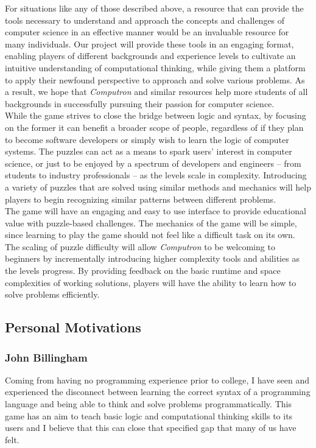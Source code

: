 For situations like any of those described above, a resource that can provide the tools necessary to understand and approach the concepts and challenges of computer science in an effective manner would be an invaluable resource for many individuals. Our project will provide these tools in an engaging format, enabling players of different backgrounds and experience levels to cultivate an intuitive understanding of computational thinking, while giving them a platform to apply their newfound perspective to approach and solve various problems. As a result, we hope that \textit{Computron} and similar resources help more students of all backgrounds in successfully pursuing their passion for computer science.\\

While the game strives to close the bridge between logic and syntax, by focusing on the former it can benefit a broader scope of people, regardless of if they plan to become software developers or simply wish to learn the logic of computer systems. The puzzles can act as a means to spark users’ interest in computer science, or just to be enjoyed by a spectrum of developers and engineers -- from students to industry professionals -- as the levels scale in complexity. Introducing a variety of puzzles that are solved using similar methods and mechanics will help players to begin recognizing similar patterns between different problems.\\

The game will have an engaging and easy to use interface to provide educational value with puzzle-based challenges. The mechanics of the game will be simple, since learning to play the game should not feel like a difficult task on its own. The scaling of puzzle difficulty will allow \textit{Computron} to be welcoming to beginners by incrementally introducing higher complexity tools and abilities as the levels progress. By providing feedback on the basic runtime and space complexities of working solutions, players will have the ability to learn how to solve problems efficiently.\\

\subsection{Personal Motivations}
\subsubsection{John Billingham}
Coming from having no programming experience prior to college, I have seen and experienced the disconnect between learning the correct syntax of a programming language and being able to think and solve problems programmatically. This game has an aim to teach basic logic and computational thinking skills to its users and I believe that this can close that specified gap that many of us have felt.

